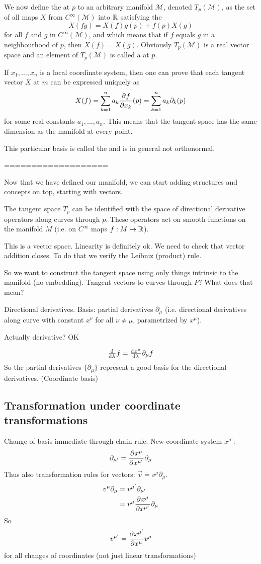 We now define the  at $p$ to an arbitrary manifold $\mathcal{M}$, denoted $T_p(\mathcal{M})$, as the set of all  maps $X$ from $C^\infty(\mathcal{M})$ into $\mathbb{R}$ satisfying the 
\[X(fg) = X(f)g(p) + f(p)X(g)\]
for all $f$ and $g$ in $C^\infty(\mathcal{M})$, and  which means that if $f$ equals $g$ in a neighbourhood of $p$, then $X(f) = X(g)$. Obviously $T_p(\mathcal{M})$ is a real vector space and an element of $T_p(\mathcal{M})$ is called a  at $p$.

If $x_1,\ldots, x_n$ is a local coordinate system, then one can prove that each tangent vector $X$ at $m$ can be expressed uniquely as
\[ X(f) = \sum^n_{k=1}a_k  \frac{\partial{^{}}f}{\partial{{x_k}^{}}} (p) = \sum^n_{k=1}a_k\partial_k(p) \]
for some real constants $a_1, \ldots, a_n$. This means that the tangent space has the same dimension as the manifold at every point.

This particular basis is called the  and is in general not orthonormal.

===================

Now that we have defined our manifold, we can start adding structures and concepts on top, starting with vectors.

The tangent space $T_p$ can be identified with the space of directional derivative operators along curves through $p$. These operators act on smooth functions on the manifold $M$ (i.e. on $C^\infty$ maps $f: M \to \mathbb{R}$).

This is a vector space. Linearity is definitely ok. We need to check that vector addition closes. To do that we verify the Leibniz (product) rule.

So we want to construct the tangent space using only things intrinsic to the manifold (no embedding). Tangent vectors to curves through $P$? What does that mean?

Directional derivatives. Basis: partial derivatives $\partial_\mu$ (i.e. directional derivatives along curve with constant $x^\nu$ for all $\nu\neq\mu$, parametrized by $x^\mu$).

Actually derivative? OK

\[\od{}{\lambda}f = \od{x^\mu}{\lambda}\partial_{\mu}f\]
So the partial derivatives $\{ \partial_\mu \}$ represent a good basis for the directional derivatives. (Coordinate basis)

\subsection{Transformation under coordinate transformations}
Change of basis immediate through chain rule. New coordinate system $x^{\mu'}$:
\[ \partial_{\mu'} =  \frac{\partial{^{}}x^\mu}{\partial{{x^{\mu'}}^{}}} \partial_\mu \]
Thus also transformation rules for vectors: $\vec{v} = v^\mu\partial_\mu$.
\begin{align}
v^\mu \partial_\mu &= v^{\mu'}\partial_{\mu'} \\
& = v^{\mu} \frac{\partial{^{}}x^\mu}{\partial{{x^{\mu'}}^{}}} \partial_\mu
\end{align}
So
\[ v^{\mu'} =  \frac{\partial{^{}}x^{\mu'}}{\partial{{x^\mu}^{}}} v^\mu \]
for all changes of coordinates (not just linear transformations)

